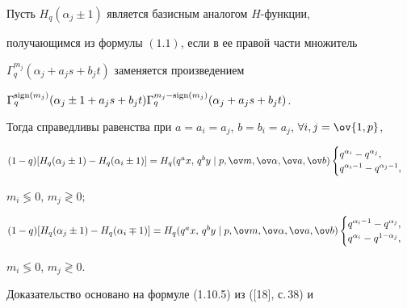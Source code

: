 \begin{thms} 


Пусть $H_q(\alpha_j\pm1)$ является базисным аналогом $H$-функции, 


получающимся из формулы $(1.1)$, если в ее правой части множитель 


$\Gamma^{m_j}_q(\alpha_j+a_j s+b_j t)$ заменяется произведением 


$\Gamma^{\sign(m_j)}_q(\alpha_j\pm 1+a_j s+b_j 


t)\Gamma^{m_j-\sign(m_j)}_q(\alpha_j+a_j s+b_j t)$. 


Тогда справедливы равенства при $a=a_i=a_j$, $b=b_i=a_j$, $\forall 


i,j=\ov{1,p}$, 


 


 $(1-q)[H_q(\alpha_j\pm1)-H_q(\alpha_i\pm1)]=H_q 


(q^a x,\,q^b y\mid p,\ov m,\ov\alpha,\ov a,\ov b) 


\begin{cases} 


q^{\alpha_i}-q^{\alpha_j},\\ 


q^{\alpha_i-1}-q^{\alpha_j-1},


\end{cases} 


$ 


$m_i\lessgtr0$, $m_j\gtrless0;$ 


 


 $(1-q)[H_q(\alpha_j\pm1)-H_q(\alpha_i\mp1)]=H_q 


(q^a x,\,q^b y\mid p,\ov m,\ov\alpha,\ov a,\ov b) 


\begin{cases} 


q^{\alpha_i-1}-q^{\alpha_j},\\ 


q^{\alpha_i}-q^{1-\alpha_j}, 


\end{cases} 


$ 


$m_i\lessgtr0$, $m_j\gtrless0$. 


\end{thms} 


 


Доказательство основано на формуле (1.10.5) из ([18], с.\,38) и 


